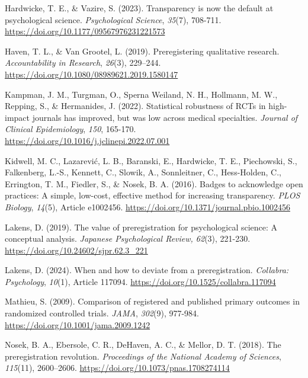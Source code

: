 \documentclass[authordate, meta, issue]{jote-new-article}
\begin{document}
	Hardwicke, T. E., \& Vazire, S. (2023). Transparency is now the default at psychological science. \emph{Psychological Science}, \emph{35}(7), 708-711. \url{https://doi.org/10.1177/09567976231221573}



	Haven, T. L., \& Van Grootel, L. (2019). Preregistering qualitative research. \emph{Accountability in Research}, \emph{26}(3), 229--244. \url{https://doi.org/10.1080/08989621.2019.1580147}



	Kampman, J. M., Turgman, O., Sperna Weiland, N. H., Hollmann, M. W., Repping, S., \& Hermanides, J. (2022). Statistical robustness of RCTs in high-impact journals has improved, but was low across medical specialties. \emph{Journal of Clinical Epidemiology}, \emph{150}, 165-170. \url{https://doi.org/10.1016/j.jclinepi.2022.07.001}



	Kidwell, M. C., Lazarević, L. B., Baranski, E., Hardwicke, T. E., Piechowski, S., Falkenberg, L.-S., Kennett, C., Slowik, A., Sonnleitner, C., Hess-Holden, C., Errington, T. M., Fiedler, S., \& Nosek, B. A. (2016). Badges to acknowledge open practices: A simple, low-cost, effective method for increasing transparency. \emph{PLOS Biology}, \emph{14}(5), Article e1002456. \url{https://doi.org/10.1371/journal.pbio.1002456}



	Lakens, D. (2019). The value of preregistration for psychological science: A conceptual analysis. \emph{Japanese Psychological Review, 62}(3), 221-230. \url{https://doi.org/10.24602/sjpr.62.3_221}



	Lakens, D. (2024). When and how to deviate from a preregistration. \emph{Collabra: Psychology}, \emph{10}(1), Article 117094. \url{https://doi.org/10.1525/collabra.117094}



	Mathieu, S. (2009). Comparison of registered and published primary outcomes in randomized controlled trials. \emph{JAMA}, \emph{302}(9), 977-984. \url{https://doi.org/10.1001/jama.2009.1242}



	Nosek, B. A., Ebersole, C. R., DeHaven, A. C., \& Mellor, D. T. (2018). The preregistration revolution. \emph{Proceedings of the National Academy of Sciences}, \emph{115}(11), 2600--2606. \url{https://doi.org/10.1073/pnas.1708274114}
\end{document}
